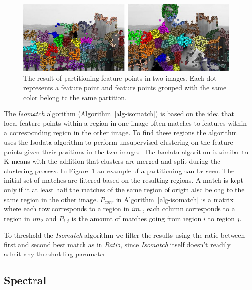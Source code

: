 \begin{figure}[htb]
	\centering
	\includegraphics[width=\columnwidth]{images/isomatch_partitions}
	\caption{The result of partitioning feature points in two images.  
	Each dot represents a feature point and feature points grouped with 
the same color belong to the same partition.}
	\label{fig:isomatch_partitions}
\end{figure}

The \emph{Isomatch} algorithm (Algorithm~\ref{alg-isomatch}) 
\cite{das2008event} is based on the idea that local feature points 
within a region in one image often matches to features within a 
corresponding region in the other image. To find these regions the 
algorithm uses the Isodata algorithm \cite{ball1965isodata} to perform 
unsupervised clustering on the feature points given their positions in 
the two images. The Isodata algorithm is similar to K-means with the 
addition that clusters are merged and split during the clustering 
process. In Figure~\ref{fig:isomatch_partitions} an example of a 
partitioning can be seen. The initial set of matches are filtered based 
on the resulting regions. A match is kept only if it at least half the 
matches of the same region of origin also belong to the same region in 
the other image.  $P_{corr}$ in Algorithm~\ref{alg-isomatch} is a matrix 
where each row corresponds to a region in $im_1$, each column 
corresponds to a region in $im_2$ and $P_{i,j}$ is the amount of matches 
going from region $i$ to region $j$.

To threshold the \emph{Isomatch} algorithm we filter the results using 
the ratio between first and second best match as in \emph{Ratio}, since 
\emph{Isomatch} itself doesn't readily admit any thresholding parameter.  

\subsection{Spectral}


